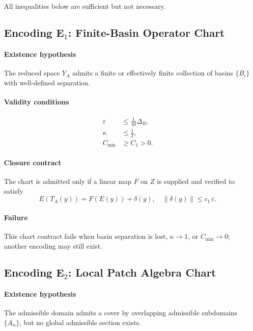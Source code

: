 \documentclass[11pt]{article}
\theoremstyle{plain}
\theoremstyle{plain}
\begin{document}
All inequalities below are sufficient but not necessary.


\subsection{Encoding \texorpdfstring{E$_1$}{E1}: Finite-Basin Operator Chart}

\paragraph{Existence hypothesis}
The reduced space $Y_A$ admits a finite or effectively finite
collection of basins $\{B_i\}$ with well-defined separation.

\paragraph{Validity conditions}
\begin{align}
\varepsilon &\le \tfrac{1}{10}\Delta_B, \\
\kappa &\le \tfrac{1}{2}, \\
C_{\min} &\ge C_1 > 0.
\end{align}

\paragraph{Closure contract}
The chart is admitted only if a linear map $F$ on $Z$ is supplied and
verified to satisfy
\[
E(T_A(y)) = F(E(y)) + \delta(y),
\quad \|\delta(y)\|\le c_1\,\varepsilon .
\]

\paragraph{Failure}
This chart contract fails when basin separation is lost, $\kappa\to 1$,
or $C_{\min}\to 0$; another encoding may still exist.


\subsection{Encoding \texorpdfstring{E$_2$}{E2}: Local Patch Algebra Chart}

\paragraph{Existence hypothesis}
The admissible domain admits a cover by overlapping admissible
subdomains $\{A_\alpha\}$, but no global admissible section exists.
\end{document}
